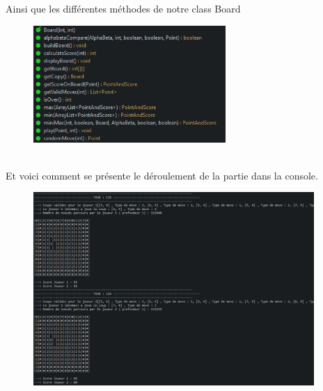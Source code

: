 Ainsi que les différentes méthodes de notre class Board
\begin{figure}[!ht]
\begin{center}
\includegraphics[width=0.65\textwidth]{./METHODESBOARD}
\end{center}
\end{figure}
\\
Et voici comment se présente le déroulement de la partie dans la console.
\begin{figure}[!ht]
\begin{center}
\includegraphics[width=0.95\textwidth]{./INTROJEU}
\end{center}
\end{figure}



